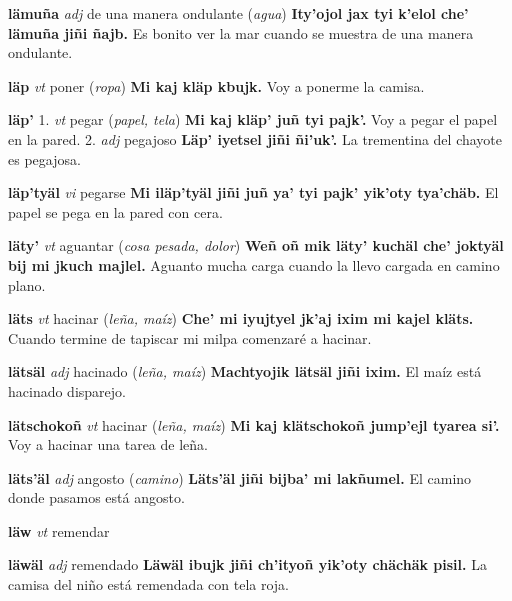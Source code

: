 \documentclass[10pt]{scrbook}
\newcommand{\entry}[1]{\textbf{#1}}
\newcommand{\onedefinition}[1]{#1.}
\newcommand{\partofspeech}[1]{\textit{#1}}
\newcommand{\spanishtranslation}[1]{#1}
\newcommand{\clarification}[1]{(\textit{#1})}
\newcommand{\cholexample}[1]{\textbf{#1}}
\newcommand{\exampletranslation}[1]{#1}
\begin{document}
\begin{multicols}{2}
\entry{lämuña}
\partofspeech{adj}
\spanishtranslation{de una manera ondulante}
\clarification{agua}
\cholexample{Ity'ojol jax tyi k'elol che' lämuña jiñi ñajb.}
\exampletranslation{Es bonito ver la mar cuando se muestra de una manera ondulante.}

\entry{läp}
\partofspeech{vt}
\spanishtranslation{poner}
\clarification{ropa}
\cholexample{Mi kaj kläp kbujk.}
\exampletranslation{Voy a ponerme la camisa.}

\entry{läp'}
\onedefinition{1}
\partofspeech{vt}
\spanishtranslation{pegar}
\clarification{papel, tela}
\cholexample{Mi kaj kläp' juñ tyi pajk'.}
\exampletranslation{Voy a pegar el papel en la pared.}
\onedefinition{2}
\partofspeech{adj}
\spanishtranslation{pegajoso}
\cholexample{Läp' iyetsel jiñi ñi'uk'.}
\exampletranslation{La trementina del chayote es pegajosa.}

\entry{läp'tyäl}
\partofspeech{vi}
\spanishtranslation{pegarse}
\cholexample{Mi iläp'tyäl jiñi juñ ya' tyi pajk' yik'oty tya'chäb.}
\exampletranslation{El papel se pega en la pared con cera.}

\entry{läty'}
\partofspeech{vt}
\spanishtranslation{aguantar}
\clarification{cosa pesada, dolor}
\cholexample{Weñ oñ mik läty' kuchäl che' joktyäl bij mi jkuch majlel.}
\exampletranslation{Aguanto mucha carga cuando la llevo cargada en camino plano.}

\entry{läts}
\partofspeech{vt}
\spanishtranslation{hacinar}
\clarification{leña, maíz}
\cholexample{Che' mi iyujtyel jk'aj ixim mi kajel kläts.}
\exampletranslation{Cuando termine de tapiscar mi milpa comenzaré a hacinar.}

\entry{lätsäl}
\partofspeech{adj}
\spanishtranslation{hacinado}
\clarification{leña, maíz}
\cholexample{Machtyojik lätsäl jiñi ixim.}
\exampletranslation{El maíz está hacinado disparejo.}

\entry{lätschokoñ}
\partofspeech{vt}
\spanishtranslation{hacinar}
\clarification{leña, maíz}
\cholexample{Mi kaj klätschokoñ jump'ejl tyarea si'.}
\exampletranslation{Voy a hacinar una tarea de leña.}

\entry{läts'äl}
\partofspeech{adj}
\spanishtranslation{angosto}
\clarification{camino}
\cholexample{Läts'äl jiñi bijba' mi lakñumel.}
\exampletranslation{El camino donde pasamos está angosto.}

\entry{läw}
\partofspeech{vt}
\spanishtranslation{remendar}

\entry{läwäl}
\partofspeech{adj}
\spanishtranslation{remendado}
\cholexample{Läwäl ibujk jiñi ch'ityoñ yik'oty chächäk pisil.}
\exampletranslation{La camisa del niño está remendada con tela roja.}


\end{multicols}
\end{document}
